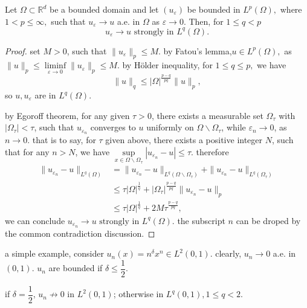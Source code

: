 \begin{lemma}
	Let $\Omega \subset \mathbb{R}^{d}$ be a bounded domain and let $\left(u_{\varepsilon}\right)$ be bounded in $L^{p}(\Omega),$ where $1<p \leq \infty,$ such that $u_{\varepsilon} \rightarrow u$ a.e. in $\Omega$ as $\varepsilon \rightarrow 0 .$ Then, for $1 \leq q<p$
	$$
	u_{\varepsilon} \rightarrow u \text { strongly in } L^{q}(\Omega).
	$$
\end{lemma}
\begin{proof}
	set $M > 0$, such that $\|u_\varepsilon\|_p \leqslant M$. by Fatou's lemma,$u\in L^p(\Omega),$ as 
	\(\|u\|_p \leqslant \liminf\limits_{\varepsilon\rightarrow 0}\|u_\varepsilon\|_p \leqslant M\).
	by H\"{o}lder inequality, for $1 \leqslant q\leqslant p,$ we have \[\|u\|_q \leqslant |\Omega|^{\frac{p-q}{pq}} \|u\|_p,\]
	so $u,u_\varepsilon$ are in $L^q(\Omega)$.
	
	by Egoroff theorem, for any given $\tau > 0$, there exists a measurable set $\Omega_\tau$ with $|\Omega_\tau| < \tau$, such that $u_{\varepsilon_n}$ converges to $u$ uniformly on $\Omega\backslash \Omega_\tau$, while $\varepsilon_n \rightarrow 0$, as $n \rightarrow 0.$
	that is to say, for $\tau$ given above, there exists a positive integer $N$, such that for any $n > N$, we have $\sup\limits_{x\in\Omega\backslash\Omega_\tau}|u_{\varepsilon_n} - u| \leqslant \tau$. therefore
	\begin{equation*}
		\begin{split}
			\|u_{\varepsilon_n} - u\|_{L^q(\Omega)} &= \|u_{\varepsilon_n} - u\|_{L^q(\Omega\backslash\Omega_\tau)} + \|u_{\varepsilon_n} - u\|_{L^q(\Omega_\tau)}\\ 
			& \leqslant \tau|\Omega|^{\frac{1}{q}} + |\Omega_\tau|^{\frac{p-q}{pq}}\|u_{\varepsilon_n } - u\|_p\\
			& \leqslant \tau|\Omega|^{\frac{1}{q}} + 2M\tau^{\frac{p-q}{pq}},
		\end{split}
	\end{equation*}
we can conclude $u_{\varepsilon_n} \rightarrow u \text { strongly in } L^{q}(\Omega)$. the subscript $n$ can be droped by the common contradiction discussion.
\end{proof}

a simple example, consider $u_n(x)=n^\delta x^n\in L^2(0,1)$. clearly, $u_n\rightarrow0$ a.e. in $(0,1)$.
$u_n$ are bounded if $\delta \leqslant \dfrac{1}{2}.$

if $\delta = \dfrac{1}{2}$, $u_n\not\rightarrow0$ in $L^2(0,1)$; otherwise in $L^q(0,1),1\leqslant q < 2$.

